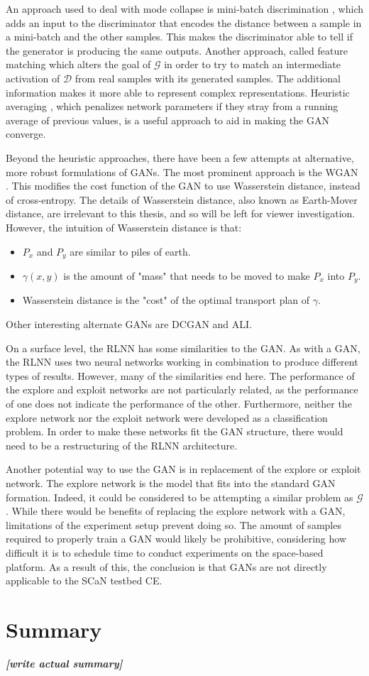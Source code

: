 	\par An approach used to deal with mode collapse is mini-batch discrimination \cite{placeholderCitation}, which adds an input to the discriminator that encodes the distance between a sample in a mini-batch and the other samples. This makes the discriminator able to tell if the generator is producing the same outputs. Another approach, called feature matching \cite{placeholderCitation} which alters the goal of $\mathcal{G}$ in order to try to match an intermediate activation of $\mathcal{D}$ from real samples with its generated samples. The additional information makes it more able to represent complex representations. Heuristic averaging \cite{placeholderCitation}, which penalizes network parameters if they stray from a running average of previous values, is a useful approach to aid in making the GAN converge. 
	\par Beyond the heuristic approaches, there have been a few attempts at alternative, more robust formulations of GANs. The most prominent approach is the WGAN \cite{bg:wganPaper}. This modifies the cost function of the GAN to use Wasserstein distance, instead of cross-entropy. The details of Wasserstein distance, also known as Earth-Mover distance, are irrelevant to this thesis, and so will be left for viewer investigation. However, the intuition of Wasserstein distance is that:  
	\begin{itemize}
		\item $P_x$ and $P_y$ are similar to piles of earth. 
		\item $\gamma(x,y)$ is the amount of "mass" that needs to be moved to make $P_x$ into $P_y$.
		\item Wasserstein distance is the "cost" of the optimal transport plan of $\gamma$.
	\end{itemize}
	Other interesting alternate GANs are DCGAN \cite{placeholderCitation} and ALI\cite{placeholderCitation}.
	\par On a surface level, the RLNN has some similarities to the GAN. As with a GAN, the RLNN uses two neural networks working in combination to produce different types of results. However, many of the similarities end here. The performance of the explore and exploit networks are not particularly related, as the performance of one does not indicate the performance of the other. Furthermore, neither the explore network nor the exploit network were developed as a classification problem. In order to make these networks fit the GAN structure, there would need to be a restructuring of the RLNN architecture.
	\par Another potential way to use the GAN is in replacement of the explore or exploit network. The explore network is the model that fits into the standard GAN formation. Indeed, it could be considered to be attempting a similar problem as $\mathcal{G}$. While there would be benefits of replacing the explore network with a GAN, limitations of the experiment setup prevent doing so. The amount of samples required to properly train a GAN would likely be prohibitive, considering how difficult it is to schedule time to conduct experiments on the space-based platform. As a result of this, the conclusion is that GANs are not directly applicable to the SCaN testbed CE.
	
	\section{Summary}
	\par \textbf{\textit{[write actual summary]}}
%